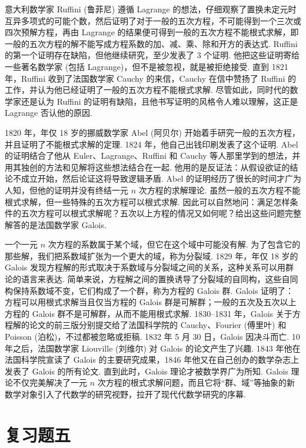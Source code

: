 \documentclass[UTF8, 12pt, fontset=fandol, oneside]{ctexart}
\begin{document}
意大利数学家 Ruffini (鲁菲尼) 遵循 Lagrange 的想法，仔细观察了置换未定元时互异多项式的可能个数，然后证明了对于一般的五次方程，不可能得到一个三次或四次预解方程，再由 Lagrange 的结果便可得到一般的五次方程不能根式求解，即一般的五次方程的解不能写成方程系数的加、减、乘、除和开方的表达式. Ruffini 的第一个证明存在缺陷，但他继续研究，至少发表了 3 个证明. 他把这些证明寄给一些著名数学家 (包括 Lagrange)，但不是被忽视，就是被拒绝接受. 直到 1821 年，Ruffini 收到了法国数学家 Cauchy 的来信，Cauchy 在信中赞扬了 Ruffini 的工作，并认为他已经证明了一般的五次方程不能根式求解. 尽管如此，同时代的数学家还是认为 Ruffini 的证明有缺陷，且他书写证明的风格令人难以理解，这正是 Lagrange 否认他的原因.

1820 年，年仅 18 岁的挪威数学家 Abel (阿贝尔) 开始着手研究一般的五次方程，并且证明了不能根式求解的定理. 1824 年，他自己出钱印刷发表了这个证明. Abel 的证明结合了他从 Euler、Lagrange、Ruffini 和 Cauchy 等人那里学到的想法，并用其独创的方法和见解将这些想法结合在一起. 他用的是反证法：从假设欲证的结论不成立开始，然后论证这将导致逻辑矛盾. Abel 的证明经历了很长的时间才广为人知，但他的证明并没有终结一元 $n$ 次方程的求解理论. 虽然一般的五次方程不能根式求解，但一些特殊的五次方程可以根式求解. 因此可以自然地问：满足怎样条件的五次方程可以根式求解呢？五次以上方程的情况又如何呢？给出这些问题完整解答的是法国数学家 Galois.

一个一元 $n$ 次方程的系数属于某个域，但它在这个域中可能没有解. 为了包含它的那些解，我们把系数域扩张为一个更大的域，称为分裂域. 1829 年，年仅 18 岁的 Galois 发现方程解的形式取决于系数域与分裂域之间的关系，这种关系可以用群论的语言来表达. 简单来说，方程解之间的置换诱导了分裂域的自同构，这些自同构保持系数域不变，它们构成了一个群，称为方程的 Galois 群. Galois 证明了：方程可以用根式求解当且仅当方程的 Galois 群是可解群；一般的五次及五次以上方程的 Galois 群不是可解群，从而不能用根式求解. 1830--1831 年，Galois 关于方程解的论文的前三版分别提交给了法国科学院的 Cauchy、Fourier (傅里叶) 和 Poisson (泊松)，不过都被忽略或拒稿. 1832 年 5 月 30 日，Galois 因决斗而亡. 10 年之后，法国数学家 Liouville (刘维尔) 对 Galois 的论文产生了兴趣. 1843 年他在法国科学院宣读了 Galois 的主要研究成果，1846 年他又在自己创办的数学杂志上发表了 Galois 的所有论文. 直到此时，Galois 理论才被数学界广为所知. Galois 理论不仅完美解决了一元 $n$ 次方程的根式求解问题，而且它将“群、域”等抽象的新数学对象引入了代数学的研究视野，拉开了现代代数学研究的序幕.

\section*{复习题五}
\end{document}
